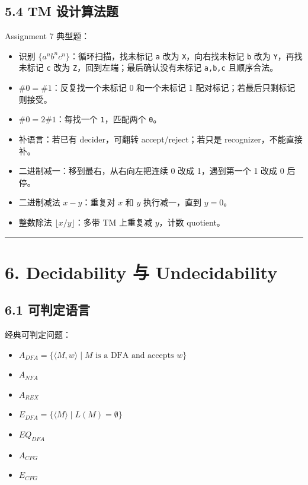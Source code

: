 ﻿\documentclass[UTF8,11pt]{ctexart}
\begin{document}
\subsection{5.4 TM 设计算法题}


Assignment 7 典型题：


\begin{itemize}
\item 识别 \(\{a^nb^nc^n\}\)：循环扫描，找未标记 \texttt{a} 改为 \texttt{X}，向右找未标记 \texttt{b} 改为 \texttt{Y}，再找未标记 \texttt{c} 改为 \texttt{Z}，回到左端；最后确认没有未标记 \texttt{a,b,c} 且顺序合法。
\item \(\#0=\#1\)：反复找一个未标记 0 和一个未标记 1 配对标记；若最后只剩标记则接受。
\item \(\#0=2\#1\)：每找一个 \texttt{1}，匹配两个 \texttt{0}。
\item 补语言：若已有 decider，可翻转 accept/reject；若只是 recognizer，不能直接补。
\item 二进制减一：移到最右，从右向左把连续 0 改成 1，遇到第一个 1 改成 0 后停。
\item 二进制减法 \(x-y\)：重复对 \(x\) 和 \(y\) 执行减一，直到 \(y=0\)。
\item 整数除法 \(\lfloor x/y\rfloor\)：多带 TM 上重复减 \(y\)，计数 quotient。
\end{itemize}


\bigskip\hrule\bigskip


\section{6. Decidability 与 Undecidability}


\subsection{6.1 可判定语言}


经典可判定问题：


\begin{itemize}
\item \(A_{DFA}=\{\langle M,w\rangle\mid M\text{ is a DFA and accepts }w\}\)
\item \(A_{NFA}\)
\item \(A_{REX}\)
\item \(E_{DFA}=\{\langle M\rangle\mid L(M)=\emptyset\}\)
\item \(EQ_{DFA}\)
\item \(A_{CFG}\)
\item \(E_{CFG}\)
\end{itemize}
\end{document}
